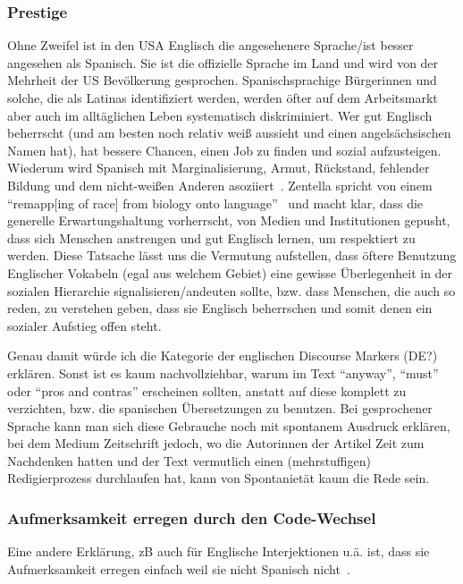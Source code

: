 \subsubsection{Prestige}
Ohne Zweifel ist in den USA Englisch die angesehenere Sprache/ist besser angesehen als Spanisch.
Sie ist die offizielle Sprache im Land und wird von der Mehrheit der US Bevölkerung gesprochen.
Spanischsprachige Bürgerinnen und solche, die als Latinas identifiziert werden, werden öfter auf dem Arbeitsmarkt aber auch im alltäglichen Leben systematisch diskriminiert.
Wer gut Englisch beherrscht (und am besten noch relativ weiß aussieht und einen angelsächsischen Namen hat), hat bessere Chancen, einen Job zu finden und sozial aufzusteigen.
Wiederum wird Spanisch mit Marginalisierung, Armut, Rückstand, fehlender Bildung und dem nicht-weißen Anderen asoziiert~\cite{Zentella07}. %
Zentella spricht von einem ``remapp[ing of race] from biology onto language''~\cite{Zentella07}
und macht klar, dass die generelle Erwartungshaltung vorherrscht, von Medien und Institutionen gepusht, dass sich Menschen anstrengen und gut Englisch lernen, um respektiert zu werden.
Diese Tatsache lässt uns die Vermutung aufstellen, dass öftere Benutzung Englischer Vokabeln (egal aus welchem Gebiet) eine gewisse Überlegenheit in der sozialen Hierarchie signalisieren/andeuten sollte, bzw. dass Menschen, die auch so reden, zu verstehen geben, dass sie Englisch beherrschen und somit denen ein sozialer Aufstieg offen steht.

Genau damit würde ich die Kategorie der englischen Discourse Markers (DE?) erklären.
Sonst ist es kaum nachvollziehbar, warum im Text ``anyway'', ``must'' oder ``pros and contras'' erscheinen sollten, anstatt auf diese komplett zu verzichten, bzw. die spanischen Übersetzungen zu benutzen. %
Bei gesprochener Sprache kann man sich diese Gebrauche noch mit spontanem Ausdruck erklären, bei dem Medium Zeitschrift jedoch, wo die Autorinnen der Artikel Zeit zum Nachdenken hatten und der Text vermutlich einen (mehrstuffigen) Redigierprozess durchlaufen hat, kann von Spontanietät kaum die Rede sein.

\subsubsection{Aufmerksamkeit erregen durch den Code-Wechsel}
Eine andere Erklärung, zB auch für Englische Interjektionen u.ä. ist, dass sie Aufmerksamkeit erregen einfach weil sie nicht Spanisch nicht~\cite[]{Mahootian05}. %

